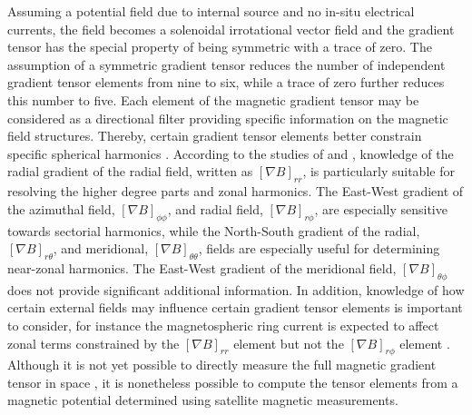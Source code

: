 \documentclass[extra,mreferee]{gji}
\begin{document}
Assuming a potential field due to internal source and no in-situ electrical currents, the field becomes a solenoidal irrotational vector field and the gradient tensor has the special property of being symmetric with a trace of zero. The assumption of a symmetric gradient tensor reduces the number of independent gradient tensor elements from nine to six, while a trace of zero further reduces this number to five. Each element of the magnetic gradient tensor may be considered as a directional filter providing specific information on the magnetic field structures. Thereby, certain gradient tensor elements better constrain specific spherical harmonics \citep{Olsen_Kotsiaros_2011}. According to the studies of \cite{kotsiaros_Olsen_2012} and \cite{kotsiaros_Olsen_2014}, knowledge of the radial gradient of the radial field, written as $\left[\nabla B\right]_{rr}$, is particularly suitable for resolving the higher degree parts and zonal harmonics. The East-West gradient of the azimuthal field, $\left[\nabla B\right]_{\phi \phi}$, and radial field, $\left[\nabla B\right]_{r \phi}$, are especially sensitive towards sectorial harmonics, while the North-South gradient of the radial, $\left[\nabla B\right]_{r \theta}$, and meridional, $\left[\nabla B\right]_{\theta \theta} $, fields are especially useful for determining near-zonal harmonics. The East-West gradient of the meridional field, $\left[\nabla B\right]_{\theta \phi} $ does not provide significant additional information. In addition, knowledge of how certain external fields may influence certain gradient tensor elements is important to consider, for instance the magnetospheric ring current is expected to affect zonal terms constrained by the $\left[\nabla B\right]_{rr}$ element but not the $\left[\nabla B\right]_{r \phi}$ element \citep{kotsiaros_Olsen_2014}. Although it is not yet possible to directly measure the full magnetic gradient tensor in space \citep{Nogueira_etal_2015}, it is nonetheless possible to compute the tensor elements from a magnetic potential determined using satellite magnetic measurements. 
\end{document}
